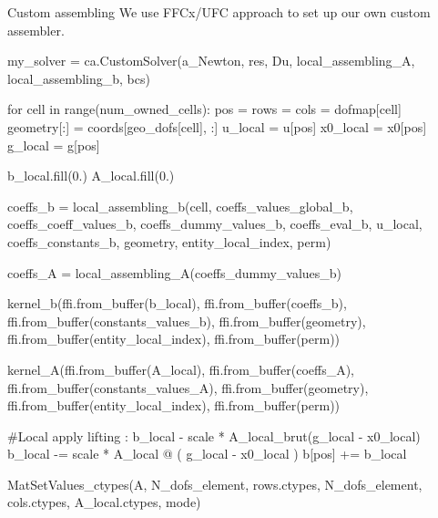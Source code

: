 \documentclass[9pt]{beamer}
\begin{document}
\begin{frame}[fragile]{Custom assembling}
  We use FFCx/UFC approach to set up our own custom assembler.

  \begin{pythoncode}
    my_solver = ca.CustomSolver(a_Newton, res, Du, local_assembling_A, local_assembling_b, bcs)
  \end{pythoncode}

  \begin{pythoncode}
    for cell in range(num_owned_cells):
      pos = rows = cols = dofmap[cell]
      geometry[:] = coords[geo_dofs[cell], :]
      u_local = u[pos]
      x0_local = x0[pos]
      g_local = g[pos]

      b_local.fill(0.)
      A_local.fill(0.)

      coeffs_b = local_assembling_b(cell, coeffs_values_global_b, coeffs_coeff_values_b, coeffs_dummy_values_b, coeffs_eval_b, u_local, coeffs_constants_b, geometry, entity_local_index, perm)

      coeffs_A = local_assembling_A(coeffs_dummy_values_b)

      kernel_b(ffi.from_buffer(b_local), 
              ffi.from_buffer(coeffs_b),
              ffi.from_buffer(constants_values_b),
              ffi.from_buffer(geometry), ffi.from_buffer(entity_local_index), ffi.from_buffer(perm))
      
      kernel_A(ffi.from_buffer(A_local), 
              ffi.from_buffer(coeffs_A),
              ffi.from_buffer(constants_values_A),
              ffi.from_buffer(geometry), ffi.from_buffer(entity_local_index), ffi.from_buffer(perm))

      #Local apply lifting : b_local - scale * A_local_brut(g_local - x0_local)
      b_local -= scale * A_local @ ( g_local - x0_local )
      b[pos] += b_local

      MatSetValues_ctypes(A, N_dofs_element, rows.ctypes, N_dofs_element, cols.ctypes, A_local.ctypes, mode)
  \end{pythoncode}
\end{frame}
\end{document}
